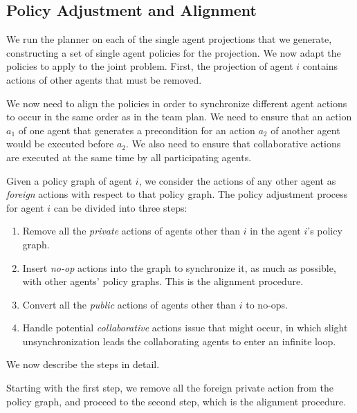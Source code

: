 \documentclass[letterpaper]{article} %
\begin{document}
\subsection{Policy Adjustment and Alignment}

We run the planner on each of the single agent projections that we generate, constructing a set of single agent policies for the projection. We now adapt the policies to apply to the joint problem. First, the projection of agent $i$ contains actions of other agents that must be removed.

We now need to align the policies in order to synchronize different agent actions to occur in the same order as in the team plan. We need to ensure that an action $a_1$ of one agent that generates a precondition for an action $a_2$ of another agent would be executed before $a_2$. We also need to ensure that collaborative actions are executed at the same time by all participating agents. 

Given a policy graph of agent $i$, we consider the actions of any other agent as \emph{foreign} actions with respect to that policy graph. The policy adjustment process for agent $i$ can be divided into three steps:
\begin{enumerate}
    \item Remove all the \emph{private} actions of agents other than $i$ in the agent $i$'s policy graph.
    \item Insert \emph{no-op} actions into the graph to synchronize it, as much as possible, with other agents' policy graphs. This is the alignment procedure.
    \item Convert all the \emph{public} actions of  agents other than $i$ to no-ops.
    \item Handle potential \emph{collaborative} actions issue that might occur, in which slight unsynchronization leads the collaborating agents to enter an infinite loop.
\end{enumerate}
We now describe the steps in detail.

Starting with the first step, we remove all the foreign private action from the policy graph, and proceed to the second step, which is the alignment procedure.
\end{document}
